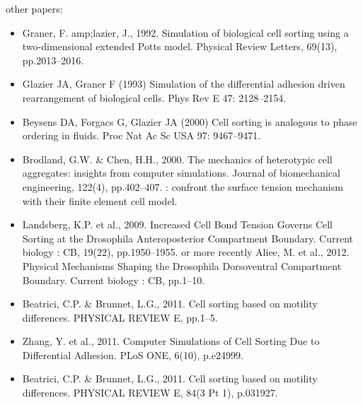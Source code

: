   other papers: 
\begin{itemize}
	\item Graner, F. amp;lazier, J., 1992. Simulation of biological cell sorting using a two-dimensional extended Potts model. Physical Review Letters, 69(13), pp.2013–2016. \cite{Graner:1992ve}
	\item Glazier JA, Graner F (1993) Simulation of the differential adhesion driven rearrangement of biological cells. Phys Rev E 47: 2128–2154. \cite{Glazier:1993ck}
	\item Beysens DA, Forgacs G, Glazier JA (2000) Cell sorting is analogous to phase ordering in fluids. Proc Nat Ac Sc USA 97: 9467–9471. \cite{Beysens:2000wj}
	\item Brodland, G.W. \& Chen, H.H., 2000. The mechanics of heterotypic cell aggregates: insights from computer simulations. Journal of biomechanical engineering, 122(4), pp.402–407. \cite{Brodland:2000uu}: confront the surface tension mechanism with their finite element cell model.
	\item Landsberg, K.P. et al., 2009. Increased Cell Bond Tension Governs Cell Sorting at the Drosophila Anteroposterior Compartment Boundary. Current biology : CB, 19(22), pp.1950–1955. \cite{Landsberg:2009bp} or more recently Aliee, M. et al., 2012. Physical Mechanisms Shaping the Drosophila Dorsoventral Compartment Boundary. Current biology : CB, pp.1–10. \cite{Aliee:2012ek}
	\item Beatrici, C.P. \& Brunnet, L.G., 2011. Cell sorting based on motility differences. PHYSICAL REVIEW E, pp.1–5. \cite{Beatrici:2011vr}
	\item Zhang, Y. et al., 2011. Computer Simulations of Cell Sorting Due to Differential Adhesion. PLoS ONE, 6(10), p.e24999. \cite{Zhang:2011ca}
	\item Beatrici, C.P. \& Brunnet, L.G., 2011. Cell sorting based on motility differences. PHYSICAL REVIEW E, 84(3 Pt 1), p.031927. \cite{Beatrici:2011vr}

\end{itemize}
